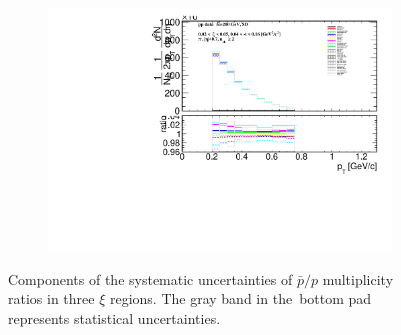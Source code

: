 \begin{figure}[h!]
\begin{subfigure}{.49\textwidth}
		\includegraphics[width=\textwidth,page=27]{chapters/chrgSTAR/img/syst/outPID_SDT.pdf}
	\end{subfigure}
	\begin{minipage}{.49\textwidth}
		\caption{Components of the systematic uncertainties of $\bar{p}/p$ multiplicity ratios  in three $\xi$ regions. The gray band in the~bottom pad represents statistical uncertainties.}
		\label{fig:results_star_syst_p}
	\end{minipage}
\end{figure}
\FloatBarrier
